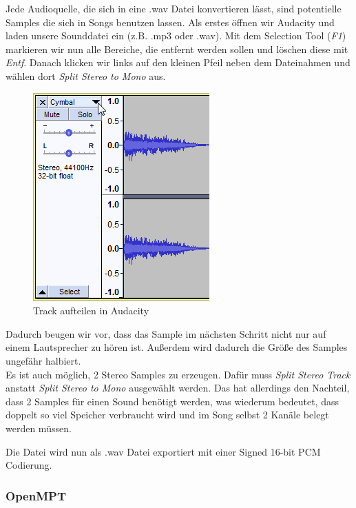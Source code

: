 Jede Audioquelle, die sich in eine .wav Datei konvertieren lässt, sind potentielle Samples die sich in Songs benutzen lassen. Als erstes öffnen wir Audacity und laden unsere Sounddatei ein
(z.B. .mp3 oder .wav). Mit dem Selection Tool (\textit{F1}) markieren wir nun alle Bereiche, die entfernt werden sollen und löschen diese mit \textit{Entf}. Danach klicken wir links auf den kleinen Pfeil neben dem Dateinahmen und wählen dort \textit{Split Stereo to Mono} aus.

\begin{figure}[htbp] \centering
	\includegraphics[width=.50\linewidth]{images/Audacity.png}
	\caption{Track aufteilen in Audacity}
	\label{Audacity}
\end{figure}

\bigskip

Dadurch beugen wir vor, dass das Sample im nächsten Schritt nicht nur auf einem Lautsprecher zu hören ist. Außerdem wird dadurch die Größe des Samples ungefähr halbiert. \\
Es ist auch möglich, 2 Stereo Samples zu erzeugen. Dafür muss \textit{Split Stereo Track} anstatt \textit{Split Stereo to Mono} ausgewählt werden. Das hat allerdings den Nachteil, dass 2 Samples für einen Sound benötigt werden, was wiederum bedeutet, dass doppelt so viel Speicher verbraucht wird und im Song selbst 2 Kanäle belegt werden müssen.

\bigskip

Die Datei wird nun als .wav Datei exportiert mit einer Signed 16-bit PCM Codierung.


\subsubsection*{OpenMPT}

